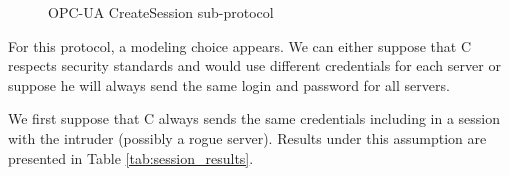 \begin{figure}[htb]
    \renewcommand{\smname}{\smse}
    \label{fig:session_se}
    \caption{OPC-UA CreateSession sub-protocol}
\end{figure}

For this protocol, a modeling choice appears.
We can either suppose that C respects security standards and would use different
credentials for each server or suppose he will always send the same login and
password for all servers.

We first suppose that C always sends the same credentials including in a session
with the intruder (possibly a rogue server).
Results under this assumption are presented in Table \ref{tab:session_results}.

